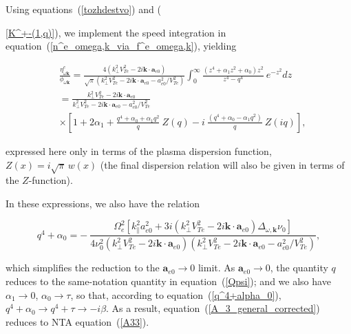 \documentclass[draft]{agujournal2019}
\renewcommand{\vec}{\mathbf}
\begin{document}
Using equations~(\ref{tozhdestvo}) and ({\ref{K^+-(1,q)}), we implement
the speed integration in equation~(\ref{n^e_omega,k_via_f^e_omega,k}), yielding
\begin{linenomath*}
\begin{align}
&  \frac{\eta_{\omega\vec{k}}^{e}}{\phi_{\omega\vec{k}}}=\frac{4(k_{\perp}%
^{2}V_{Te}^{2}-2i\vec{k}\cdot\vec{a}_{e0})}{\sqrt{\pi}(k_{\perp}^{2}V_{Te}%
^{2}-2i\vec{k}\cdot\vec{a}_{e0}-a_{e0}^{2}/V_{Te}^{2})}\int_{0}^{\infty}%
\frac{\left(  z^{4}+\alpha_{1}z^{2}+\alpha_{0}\right)  z^{2}}{z^{4}-q^{4}%
}\ e^{-z^{2}}dz\nonumber\\
&  =\frac{k_{\perp}^{2}V_{Te}^{2}-2i\vec{k}\cdot\vec{a}_{e0}}{k_{\perp}^{2}V_{Te}%
^{2}-2i\vec{k}\cdot\vec{a}_{e0}-a_{e0}^{2}/V_{Te}^{2}}\nonumber\\
&  \times\left[  1+2\alpha_{1}+\frac{q^{4}+\alpha_{0}+\alpha_{1}q^{2}}%
{q}\ Z(q)-i\ \frac{(q^{4}+\alpha_{0}-\alpha_{1}q^{2})}{q}\ Z(iq)\right],
\label{A_3_general_corrected}%
\end{align}
\end{linenomath*}
expressed here only in terms of the plasma dispersion function, $Z(x)=i\sqrt{\pi}\,w(x)$ 
(the final dispersion relation will also be given in terms of the $Z$-function). 

In these expressions, we also have the relation
\begin{linenomath*}
\begin{equation}
q^{4}+\alpha_{0}=-\ \frac{\Omega_{e}^{2}\left[  k_{\|}^{2}a_{e0}%
^{2}+3i(k_{\perp}^{2}V_{Te}^{2}-2i\vec{k}\cdot\vec{a}_{e0}%
)\Delta_{\omega,\vec{k}}\nu_{0}\right]  }{4\nu_{0}^{2}(k_{\perp}^{2}V_{Te}%
^{2}-2i\vec{k}\cdot\vec{a}_{e0})(k_{\perp}^{2}V_{Te}^{2}-2i\vec
{k}\cdot\vec{a}_{e0}-a_{e0}^{2}/V_{Te}^{2})},
\label{q^4+alpha_0}
\end{equation}
\end{linenomath*}
which simplifies the reduction to the $\vec{a}_{e0}\rightarrow 0$ limit.
As $\vec{a}_{e0}\rightarrow 0$, the quantity $q$ reduces to the same-notation quantity in 
equation~(\ref{Qpsi}); and we also have $\alpha_1\rightarrow 0$, $\alpha_0\rightarrow \tau$, so that, 
according to equation~(\ref{q^4+alpha_0}),  $q^4 + \alpha_0 \rightarrow q^4 + \tau\rightarrow - i\beta$.
As a result, equation~(\ref{A_3_general_corrected}) reduces to NTA equation~(\ref{A33}).

}
\end{document}
